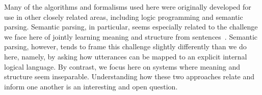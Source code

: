 \documentclass[10pt, twocolumn]{article}
\begin{document}
Many of the algorithms and formalisms used here were originally
developed for use in other closely related areas, including logic
programming and semantic parsing. Semantic parsing, in particular,
seems especially related to the challenge we face here of jointly
learning meaning and structure from
sentences~\cite{berant2013semantic, liang2013learning,
  kwiatkowski2010inducing, poon2009unsupervised}. Semantic parsing,
however, tends to frame this challenge slightly differently than we do
here, namely, by asking how utterances can be mapped to an explicit
internal logical language. By contrast, we focus here on systems where
meaning and structure seem inseparable. Understanding how these two
approaches relate and inform one another is an interesting and open
question.




\end{document}
